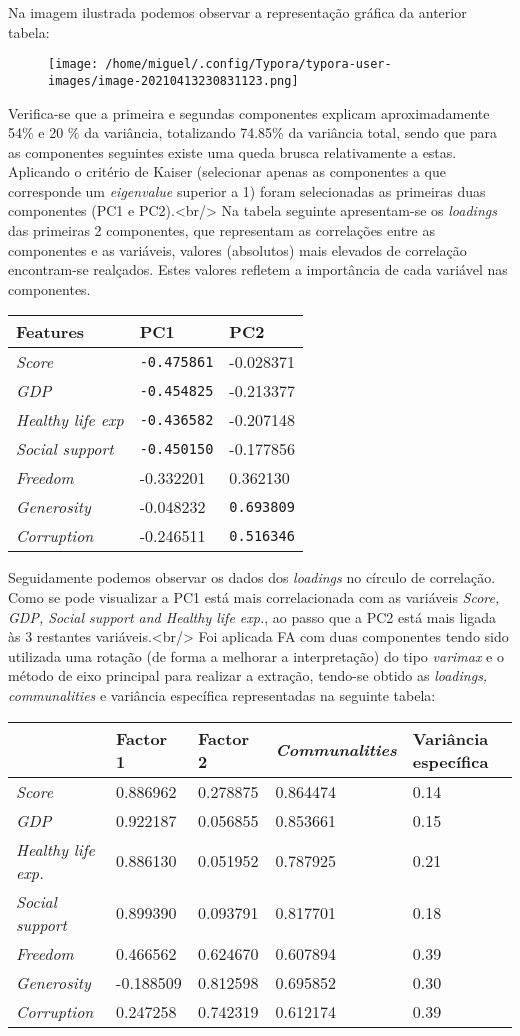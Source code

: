 \documentclass[]{article}
\begin{document}
Na imagem ilustrada podemos observar a representação gráfica da anterior
tabela:

\begin{figure}
\centering
\texttt{[image: /home/miguel/.config/Typora/typora-user-images/image-20210413230831123.png]}
\caption{}
\end{figure}

Verifica-se que a primeira e segundas componentes explicam
aproximadamente 54\% e 20 \% da variância, totalizando 74.85\% da
variância total, sendo que para as componentes seguintes existe uma
queda brusca relativamente a estas. Aplicando o critério de Kaiser
(selecionar apenas as componentes a que corresponde um \emph{eigenvalue}
superior a 1) foram selecionadas as primeiras duas componentes (PC1 e
PC2).\textless{}br/\textgreater{} Na tabela seguinte apresentam-se os
\emph{loadings} das primeiras 2 componentes, que representam as
correlações entre as componentes e as variáveis, valores (absolutos)
mais elevados de correlação encontram-se realçados. Estes valores
refletem a importância de cada variável nas componentes.

\begin{longtable}[]{@{}lll@{}}
\toprule
Features & PC1 & PC2\tabularnewline
\midrule
\endhead
\emph{Score} & \texttt{-0.475861} & -0.028371\tabularnewline
\emph{GDP} & \texttt{-0.454825} & -0.213377\tabularnewline
\emph{Healthy life exp} & \texttt{-0.436582} & -0.207148\tabularnewline
\emph{Social support} & \texttt{-0.450150} & -0.177856\tabularnewline
\emph{Freedom} & -0.332201 & 0.362130\tabularnewline
\emph{Generosity} & -0.048232 & \texttt{0.693809}\tabularnewline
\emph{Corruption} & -0.246511 & \texttt{0.516346}\tabularnewline
\bottomrule
\end{longtable}

Seguidamente podemos observar os dados dos \emph{loadings} no círculo de
correlação. Como se pode visualizar a PC1 está mais correlacionada com
as variáveis \emph{Score, GDP, Social support and Healthy life exp.}, ao
passo que a PC2 está mais ligada às 3 restantes
variáveis.\textless{}br/\textgreater{} Foi aplicada FA com duas
componentes tendo sido utilizada uma rotação (de forma a melhorar a
interpretação) do tipo \emph{varimax} e o método de eixo principal para
realizar a extração, tendo-se obtido as \emph{loadings, communalities} e
variância específica representadas na seguinte tabela:

\begin{longtable}[]{@{}lllll@{}}
\toprule
& Factor 1 & Factor 2 & \emph{Communalities} & Variância
específica\tabularnewline
\midrule
\endhead
\emph{Score} & 0.886962 & 0.278875 & 0.864474 & 0.14\tabularnewline
\emph{GDP} & 0.922187 & 0.056855 & 0.853661 & 0.15\tabularnewline
\emph{Healthy life exp.} & 0.886130 & 0.051952 & 0.787925 &
0.21\tabularnewline
\emph{Social support} & 0.899390 & 0.093791 & 0.817701 &
0.18\tabularnewline
\emph{Freedom} & 0.466562 & 0.624670 & 0.607894 & 0.39\tabularnewline
\emph{Generosity} & -0.188509 & 0.812598 & 0.695852 &
0.30\tabularnewline
\emph{Corruption} & 0.247258 & 0.742319 & 0.612174 & 0.39\tabularnewline
\bottomrule
\end{longtable}
\end{document}
